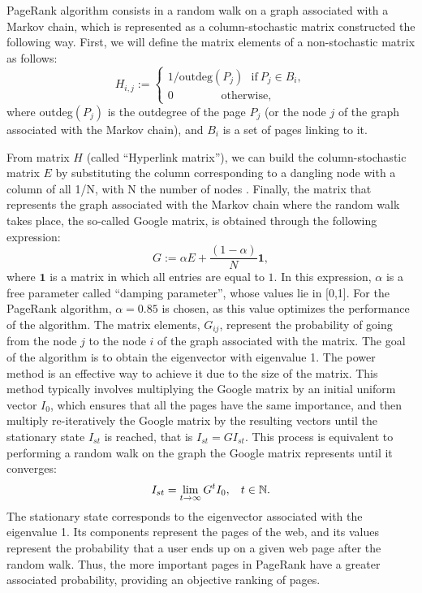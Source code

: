 \documentclass[nofootinbib,aps,prd,reprint,superscriptaddress,floatfix]{revtex4-2}
\begin{document}
PageRank algorithm consists in a random walk on a graph associated with a Markov chain, which is represented as a column-stochastic matrix constructed the following way. First, we will define the matrix elements of a non-stochastic matrix as follows: 
\begin{equation}\label{eq:Hyperlink_matrix}
	H_{i,j} := 
	\left\lbrace\begin{array}{c}
		1/\text{outdeg}(P_j) \ \ \ \text{if} \ P_j \in B_i,\\
		0 \ \ \ \ \ \ \ \ \ \ \ \ \ \ \ \ \ \ \ \text{otherwise},
	\end{array}
	\right.
\end{equation} 
where outdeg$(P_{j})$ is the outdegree of the page $P_{j}$ (or the node $j$ of the graph associated with the Markov chain), and $B_{i}$ is a set of pages linking to it.

From matrix $H$ (called ``Hyperlink matrix''), we can build the column-stochastic matrix $E$ by substituting the column corresponding to a dangling node with a column of all 1/N, with N the number of nodes \cite{Paparo1}. Finally, the matrix that represents the graph associated with the Markov chain where the random walk takes place, the so-called Google matrix, is obtained through the following expression:
\begin{equation}
\label{eq:Google_matrix}
    G:=\alpha E + \frac{(1-\alpha)}{N}\textbf{1},
\end{equation}
where $\textbf{1}$ is a matrix in which all entries are equal to $1$. In this expression, $\alpha$ is a free parameter called ``damping parameter'', whose values lie in [0,1]. For the PageRank algorithm, $\alpha=0.85$ is chosen, as this value optimizes the performance of the algorithm. The matrix elements, $G_{ij}$, represent the probability of going from the node $j$ to the node $i$ of the graph associated with the matrix. The goal of the algorithm is to obtain the eigenvector with eigenvalue 1. The power method is an effective way to achieve it due to the size of the matrix. This method typically involves multiplying the Google matrix by an initial uniform vector $I_{0}$, which ensures that all the pages have the same importance, and then multiply re-iteratively the Google matrix by the resulting vectors until the stationary state $I_{st}$ is reached, that is $I_{st}=GI_{st}$. This process is equivalent to performing a random walk on the graph the Google matrix represents until it converges:
\begin{equation}\label{eq:Stationary_state_PageRank}
    I_{st}=\lim_{t \to \infty}G^{t}I_{0}, \hspace{3mm}  t\in \mathbb{N}.
\end{equation}
The stationary state corresponds to the eigenvector associated with the eigenvalue 1. Its components represent the pages of the web, and its values represent the probability that a user ends up on a given web page after the random walk. Thus, the more important pages in PageRank have a greater associated probability, providing an objective ranking of pages.
\end{document}

